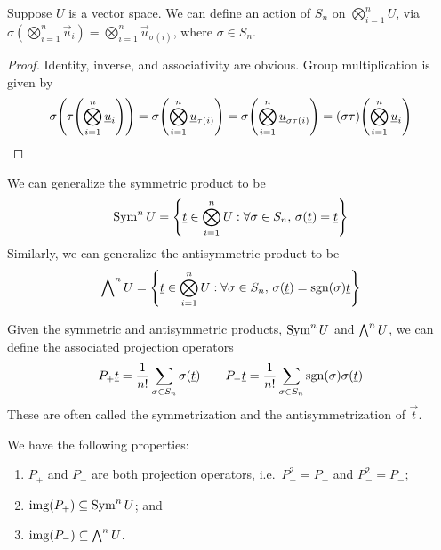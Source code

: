 \begin{lemma}
    Suppose \(U\) is a vector space.
    We can define an action of \(S_n\) on \(\bigotimes_{i=1}^n U\),
    via \(\sigma(\bigotimes_{i=1}^n \vec{u}_i) = \bigotimes_{i=1}^n \vec{u}_{\sigma(i)}\),
    where \(\sigma \in S_n\).
\end{lemma}
\begin{proof}
    Identity, inverse, and associativity are obvious.
    Group multiplication is given by
    \begin{equation*}
        \sigma\pqty{\tau\pqty{\bigotimes_{i=1}^n \vec{u}_i}}
        = \sigma\pqty{\bigotimes_{i=1}^n \vec{u}_{\tau(i)}}
        = \sigma\pqty{\bigotimes_{i=1}^n \vec{u}_{\sigma\tau(i)}}
        = (\sigma\tau)\pqty{\bigotimes_{i=1}^n \vec{u}_i}
    \end{equation*}
\end{proof}
\begin{definition}
    We can generalize the symmetric product to be
    \begin{equation*}
        \Sym^n U = \Bqty{\vec{t} \in \bigotimes_{i=1}^n U: \forall\sigma \in S_n,\,\sigma(\vec{t}) = \vec{t}}
    \end{equation*}
    Similarly, we can generalize the antisymmetric product to be
    \begin{equation*}
        \Asym^n U = \Bqty{\vec{t} \in \bigotimes_{i=1}^n U: \forall\sigma \in S_n,\,\sigma(\vec{t}) = \sgn(\sigma)\vec{t}}
    \end{equation*}
\end{definition}
\begin{definition}
    Given the symmetric and antisymmetric products, \(\operatorname{Sym}^n U\) and \(\operatorname{{\bigwedge}}^n U\),
    we can define the associated projection operators
    \begin{equation*}
        P_+\underline{t} = \frac{1}{n!} \sum_{\sigma \in S_n} \sigma(\underline{t}) \qquad
        P_-\underline{t} = \frac{1}{n!} \sum_{\sigma \in S_n} \operatorname{sgn}(\sigma) \sigma(\underline{t})
    \end{equation*}
    These are often called the symmetrization and the antisymmetrization of \(\vec{t}\).
\end{definition}
\begin{proposition}\label{prop:symmetrization-prop}
    We have the following properties:
    \begin{enumerate}[label={(\alph*)}, itemsep=0mm]
        \item \(P_+\) and \(P_-\) are both projection operators,
            i.e.\ \(P_+^2 = P_+\) and \(P_-^2 = P_-\);
        \item \(\operatorname{img}(P_+) \subseteq \operatorname{Sym}^n U\); and
        \item \(\operatorname{img}(P_-) \subseteq \operatorname{{\bigwedge}}^n U\).
    \end{enumerate}
\end{proposition}
